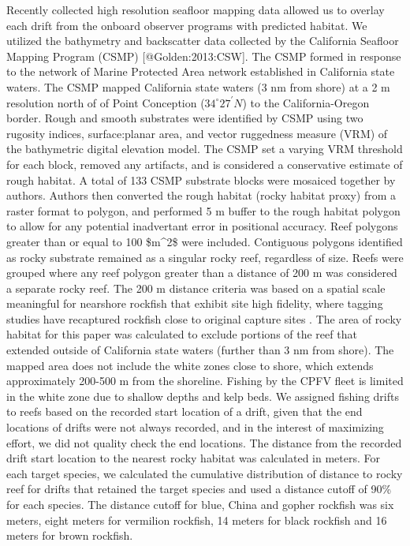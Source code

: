 \documentclass[
  authoryear,
  preprint,
  3p]{elsarticle}
\begin{document}
Recently collected high resolution seafloor mapping data allowed us to
overlay each drift from the onboard observer programs with predicted
habitat. We utilized the bathymetry and backscatter data collected by
the California Seafloor Mapping Program (CSMP) {[}@Golden:2013:CSW{]}.
The CSMP formed in response to the network of Marine Protected Area
network established in California state waters. The CSMP mapped
California state waters (3 nm from shore) at a 2 m resolution north of
of Point Conception (\(34^\circ 27^\prime N\)) to the California-Oregon
border. Rough and smooth substrates were identified by CSMP using two
rugosity indices, surface:planar area, and vector ruggedness measure
(VRM) of the bathymetric digital elevation model. The CSMP set a varying
VRM threshold for each block, removed any artifacts, and is considered a
conservative estimate of rough habitat. A total of 133 CSMP substrate
blocks were mosaiced together by authors. Authors then converted the
rough habitat (rocky habitat proxy) from a raster format to polygon, and
performed 5 m buffer to the rough habitat polygon to allow for any
potential inadvertant error in positional accuracy. Reef polygons
greater than or equal to 100 \$m\^{}2\$ were included. Contiguous
polygons identified as rocky substrate remained as a singular rocky
reef, regardless of size. Reefs were grouped where any reef polygon
greater than a distance of 200 m was considered a separate rocky reef.
The 200 m distance criteria was based on a spatial scale meaningful for
nearshore rockfish that exhibit site high fidelity, where tagging
studies have recaptured rockfish close to original capture sites
\citep{Lea:1999:BAM, Matthews:1985:SSM, Hannah:2011:SFM, Hannah:2012:UNC}.
The area of rocky habitat for this paper was calculated to exclude
portions of the reef that extended outside of California state waters
(further than 3 nm from shore). The mapped area does not include the
white zones close to shore, which extends approximately 200-500 m from
the shoreline. Fishing by the CPFV fleet is limited in the white zone
due to shallow depths and kelp beds. We assigned fishing drifts to reefs
based on the recorded start location of a drift, given that the end
locations of drifts were not always recorded, and in the interest of
maximizing effort, we did not quality check the end locations. The
distance from the recorded drift start location to the nearest rocky
habitat was calculated in meters. For each target species, we calculated
the cumulative distribution of distance to rocky reef for drifts that
retained the target species and used a distance cutoff of 90\% for each
species. The distance cutoff for blue, China and gopher rockfish was six
meters, eight meters for vermilion rockfish, 14 meters for black
rockfish and 16 meters for brown rockfish.
\end{document}
